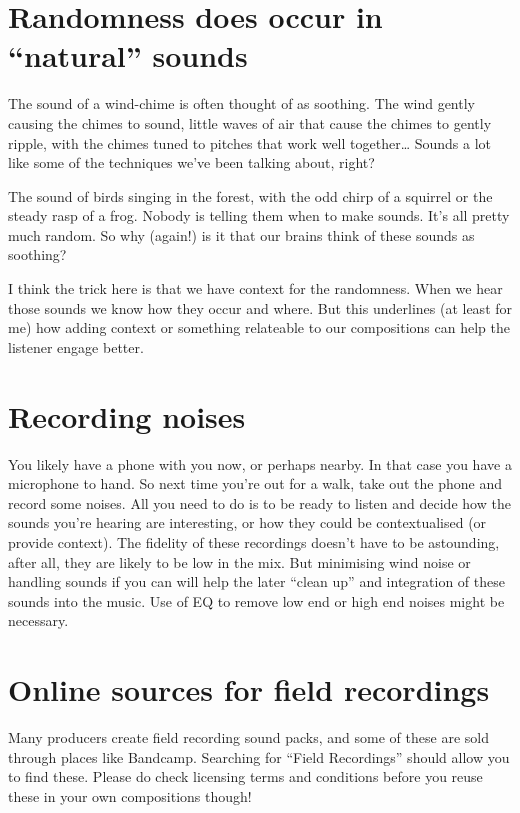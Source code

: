 \documentclass[
  12pt,
  letterpaper,
  oneside,
  open=any]{scrbook}
\begin{document}
\section{Randomness does occur in ``natural''
sounds}\label{randomness-does-occur-in-natural-sounds}

The sound of a wind-chime is often thought of as soothing. The wind
gently causing the chimes to sound, little waves of air that cause the
chimes to gently ripple, with the chimes tuned to pitches that work well
together\ldots{} Sounds a lot like some of the techniques we've been
talking about, right?

The sound of birds singing in the forest, with the odd chirp of a
squirrel or the steady rasp of a frog. Nobody is telling them when to
make sounds. It's all pretty much random. So why (again!) is it that our
brains think of these sounds as soothing?

I think the trick here is that we have context for the randomness. When
we hear those sounds we know how they occur and where. But this
underlines (at least for me) how adding context or something relateable
to our compositions can help the listener engage better.

\section{Recording noises}\label{recording-noises}

You likely have a phone with you now, or perhaps nearby. In that case
you have a microphone to hand. So next time you're out for a walk, take
out the phone and record some noises. All you need to do is to be ready
to listen and decide how the sounds you're hearing are interesting, or
how they could be contextualised (or provide context). The fidelity of
these recordings doesn't have to be astounding, after all, they are
likely to be low in the mix. But minimising wind noise or handling
sounds if you can will help the later ``clean up'' and integration of
these sounds into the music. Use of EQ to remove low end or high end
noises might be necessary.

\section{Online sources for field
recordings}\label{online-sources-for-field-recordings}

Many producers create field recording sound packs, and some of these are
sold through places like Bandcamp. Searching for ``Field Recordings''
should allow you to find these. Please do check licensing terms and
conditions before you reuse these in your own compositions though!
\end{document}

